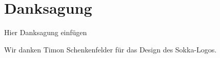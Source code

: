 \section*{Danksagung}

Hier Danksagung einfügen

Wir danken Timon Schenkenfelder für das Design des Sokka-Logos.

\newpage